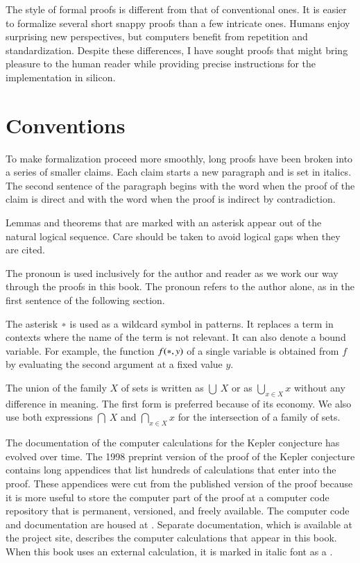 The style of formal proofs is different from that of conventional
ones.  It is easier to formalize several short snappy proofs
than a few intricate ones.  Humans enjoy surprising new perspectives,
but computers benefit from repetition and standardization.  Despite
these differences, I have sought  proofs that might bring
pleasure to the human reader while providing precise instructions for
the implementation in silicon.

\section*{Conventions}

To make formalization proceed more smoothly, long proofs have been
broken into a series of smaller claims.  Each claim starts a new paragraph
and is set in italics.  The second sentence of the paragraph begins with
the word  when the proof of the claim is direct and with
the word  when the proof is indirect by contradiction.

Lemmas and theorems that are marked with an asterisk appear out of
the natural logical sequence.  Care should be taken to avoid logical gaps
when they are cited.

The pronoun  is used inclusively for the author and reader as
we work our way through the proofs in this book.  The pronoun  
refers to the author alone, as in the first sentence of the following section.

The asterisk ${*}$ is used as a wildcard symbol in patterns.  It
replaces a term in contexts where the name of the term is not
relevant.  It can also denote a bound variable.  For example, the
function $f({*},y)$ of a single variable is obtained from $f$ by
evaluating the second argument at a fixed value $y$.

The union of the family $X$ of sets is written as $\bigcup\ X$ or as
$\bigcup_{x\in X} x$ without any difference in meaning.  The first form
is preferred because of its economy.  We also use both expressions
$\bigcap\ X$ and $\bigcap_{x\in X} x$ for the intersection of a family of sets.

The documentation of the computer calculations for the Kepler
conjecture has evolved over time.  The 1998 preprint version of the
proof of the Kepler conjecture contains long appendices that list
hundreds of calculations that enter into the proof.  These appendices
were cut from the published version of the proof because it is more
useful to store the computer part of the proof at a computer code
repository that is permanent, versioned, and freely available.  The
computer code and documentation are housed at .  Separate documentation, which is available at the
project site, describes the computer calculations that appear in this
book.  When this book uses an external calculation, it is marked in
italic font as a .

